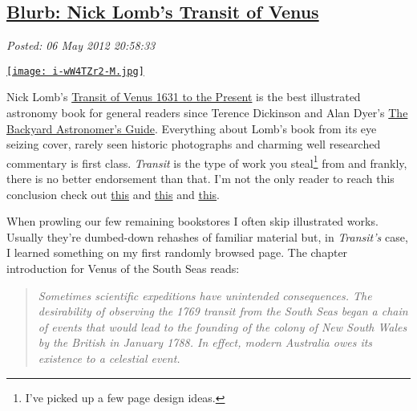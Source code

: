 %

\subsection*{\href{http://bakerjd99.wordpress.com/2012/05/06/blurb-nick-lombs-transit-of-venus/}{Blurb: Nick Lomb's Transit of Venus}}


\noindent\emph{Posted: 06 May 2012 20:58:33}
\vspace{6pt}

\captionsetup[floatingfigure]{labelformat=empty}
\begin{floatingfigure}[l]{0.25\textwidth}
\centering
\href{http://www.amazon.com/Transit-Venus-Present-Nick-Lomb/dp/1615190554}{\texttt{[image: i-wW4TZr2-M.jpg]}}
\label{fig:2744X0}
\end{floatingfigure}Nick
Lomb's \href{http://www.amazon.com/Transit-Venus-Present-Nick-Lomb/dp/1615190554}{Transit
of Venus 1631 to the Present} is the best illustrated astronomy book for
general readers since Terence Dickinson and Alan Dyer's
\href{http://www.barnesandnoble.com/w/the-backyard-astronomers-guide-terence-dickinson/1000313829}{The
Backyard Astronomer's Guide}. Everything about Lomb's book from its eye
seizing cover, rarely seen historic photographs and charming well
researched commentary is first class. \emph{Transit} is the type of work
you steal\footnote{
I've picked up a few page design ideas.
}
from and frankly, there is no better
endorsement than that. I'm not the only reader to reach this conclusion
check out
\href{http://transitofvenus.nl/wp/2011/11/03/nick-lombs-new-book/}{this}
and \href{http://adsabs.harvard.edu/full/2005Obs...125...45H}{this} and
\href{http://www.goodreads.com/book/show/13013236-transit-of-venus}{this}.

When prowling our few remaining bookstores I often skip illustrated
works. Usually they're dumbed-down rehashes of familiar material but, in
\emph{Transit's} case, I learned something on my first randomly browsed
page. The chapter introduction for Venus of the South Seas reads:

\begin{quotation}
\emph{Sometimes scientific expeditions have unintended consequences. The
desirability of observing the 1769 transit from the South Seas began a
chain of events that would lead to the founding of the colony of New
South Wales by the British in January 1788. In effect, modern Australia
owes its existence to a celestial event.}
\end{quotation}

